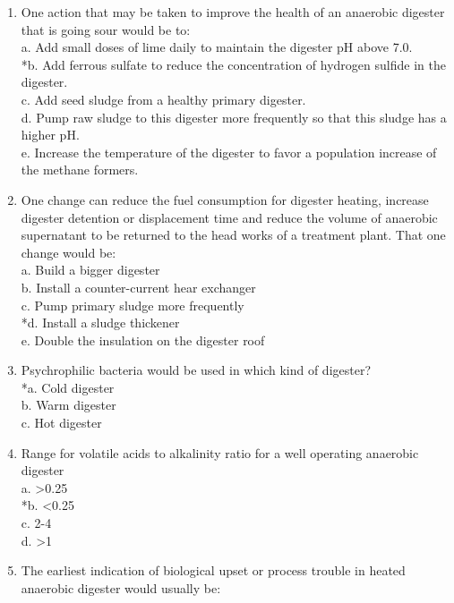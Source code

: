 \documentclass{article}
\begin{document}
\begin{enumerate}
\item  One action that may be taken to improve the health of an anaerobic digester that is going sour would be to: \\

a. Add small doses of lime daily to maintain the digester pH above 7.0. \\
*b. Add ferrous sulfate to reduce the concentration of hydrogen sulfide in the digester. \\
c. Add seed sludge from a healthy primary digester. \\
d. Pump raw sludge to this digester more frequently so that this sludge has a higher pH. \\
e. Increase the temperature of the digester to favor a population increase of the methane formers. \\

\item  One change can reduce the fuel consumption for digester heating, increase digester detention or displacement time and reduce the volume of anaerobic supernatant to be returned to the head works of a treatment plant. That one change would be: \\

a. Build a bigger digester \\
b. Install a counter-current hear exchanger \\
c. Pump primary sludge more frequently \\
*d. Install a sludge thickener \\
e. Double the insulation on the digester roof \\

\item  Psychrophilic bacteria would be used in which kind of digester? \\

*a. Cold digester \\
b. Warm digester \\
c. Hot digester \\

\item  Range for volatile acids to alkalinity ratio for a well operating anaerobic digester \\

a. >0.25 \\
*b. <0.25 \\
c. 2-4 \\
d. >1 \\

\item  The earliest indication of biological upset or process trouble in heated anaerobic digester would usually be: \\


\end{enumerate}
\end{document}
